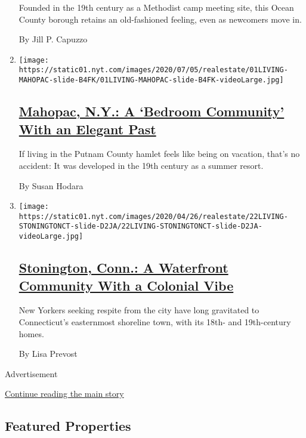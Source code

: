 \begin{enumerate}
  Founded in the 19th century as a Methodist camp meeting site, this
  Ocean County borough retains an old-fashioned feeling, even as
  newcomers move in.

  By Jill P. Capuzzo
\item
  \texttt{[image: https://static01.nyt.com/images/2020/07/05/realestate/01LIVING-MAHOPAC-slide-B4FK/01LIVING-MAHOPAC-slide-B4FK-videoLarge.jpg]}

  \hypertarget{mahopac-ny-a-bedroom-community-with-an-elegant-past}{%
  \subsection{\texorpdfstring{\href{/2020/07/01/realestate/mahopac-ny-a-bedroom-community-with-an-elegant-past.html}{Mahopac,
  N.Y.: A `Bedroom Community' With an Elegant
  Past}}{Mahopac, N.Y.: A `Bedroom Community' With an Elegant Past}}\label{mahopac-ny-a-bedroom-community-with-an-elegant-past}}

  If living in the Putnam County hamlet feels like being on vacation,
  that's no accident: It was developed in the 19th century as a summer
  resort.

  By Susan Hodara
\item
  \texttt{[image: https://static01.nyt.com/images/2020/04/26/realestate/22LIVING-STONINGTONCT-slide-D2JA/22LIVING-STONINGTONCT-slide-D2JA-videoLarge.jpg]}

  \hypertarget{stonington-conn-a-waterfront-community-with-a-colonial-vibe}{%
  \subsection{\texorpdfstring{\href{/2020/04/22/realestate/stonington-conn-a-waterfront-community-with-a-colonial-vibe.html}{Stonington,
  Conn.: A Waterfront Community With a Colonial
  Vibe}}{Stonington, Conn.: A Waterfront Community With a Colonial Vibe}}\label{stonington-conn-a-waterfront-community-with-a-colonial-vibe}}

  New Yorkers seeking respite from the city have long gravitated to
  Connecticut's easternmost shoreline town, with its 18th- and
  19th-century homes.

  By Lisa Prevost
\end{enumerate}

Advertisement

\protect\hyperlink{after-mid2}{Continue reading the main story}

\hypertarget{featured-properties}{%
\subsection{Featured Properties}\label{featured-properties}}

